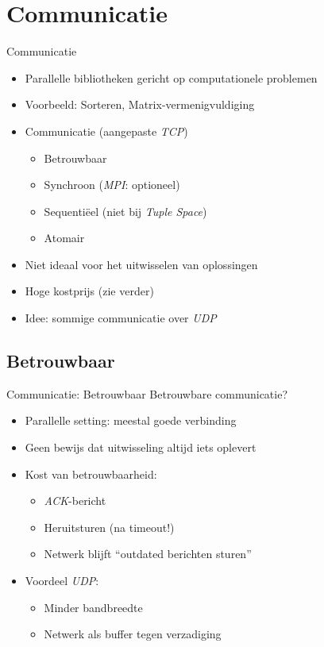 \documentclass[handout]{beamer}
\begin{document}
\section{Communicatie}
\begin{frame}{Communicatie}
\begin{itemize}[<+->]
 \item Parallelle bibliotheken gericht op computationele problemen
 \item Voorbeeld: Sorteren, Matrix-vermenigvuldiging
 \item Communicatie (aangepaste \emph{TCP})
 \begin{itemize}[<+->]
  \item Betrouwbaar
  \item Synchroon (\emph{MPI}: optioneel)
  \item Sequenti\"eel (niet bij \emph{Tuple Space})
  \item Atomair
 \end{itemize}
 \item Niet ideaal voor het uitwisselen van oplossingen
 \item Hoge kostprijs (zie verder)
 \item Idee: sommige communicatie over \emph{UDP}
\end{itemize}
\end{frame}
\subsection{Betrouwbaar}
\begin{frame}{Communicatie: Betrouwbaar}
Betrouwbare communicatie?
\begin{itemize}[<+->]
 \item Parallelle setting: meestal goede verbinding
 \item Geen bewijs dat uitwisseling altijd iets oplevert
 \item Kost van betrouwbaarheid:
 \begin{itemize}[<+->]
  \item \emph{ACK}-bericht
  \item Heruitsturen (na timeout!)
  \item Netwerk blijft ``outdated berichten sturen''
 \end{itemize}
 \item Voordeel \emph{UDP}:
 \begin{itemize}
  \item Minder bandbreedte
  \item Netwerk als buffer tegen verzadiging
 \end{itemize}
\end{itemize}
\end{frame}
\end{document}
